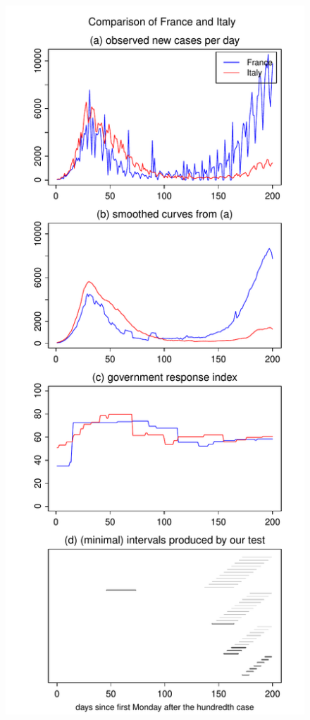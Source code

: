 \documentclass[a4paper,12pt]{article}
\numberwithin{equation}{section}
\begin{document}
{\begin{figure}[h!]
\begin{minipage}[t]{0.49\textwidth}
\includegraphics[width=\textwidth]{plots/FRA_vs_ITA_long}

\end{minipage}
\end{figure}}
\end{document}
